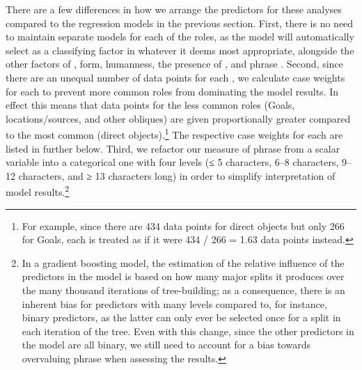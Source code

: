 \documentclass[output=paper,colorlinks,citecolor=brown,draftmode]{langscibook}
\begin{document}
There are a few differences in how we arrange the predictors for these analyses compared to the regression models in the previous section. First, there is no need to maintain separate models for each of the roles, as the model will automatically select  as a classifying factor in whatever it deems most appropriate, alongside the other factors of , form, humanness, the presence of , and phrase . Second, since there are an unequal number of data points for each , we calculate case weights for each  to prevent more common roles from dominating the model results. In effect this means that data points for the less common roles (Goals, locations/sources, and other obliques) are given proportionally greater  compared to the most common  (direct objects).\footnote{For example, since there are 434 data points for direct objects but only 266 for Goals, each  is treated as if it were 434 / 266 = 1.63 data points instead.} The respective case weights for each  are listed in  further below. Third, we refactor our measure of phrase  from a scalar variable into a categorical one with four levels (≤ 5 characters, 6–8 characters, 9–12 characters, and ≥ 13 characters long) in order to simplify interpretation of model results.\footnote{In a gradient boosting model, the estimation of the relative influence of the predictors in the model is based on how many major splits it produces over the many thousand iterations of tree-building; as a consequence, there is an inherent bias for predictors with many levels compared to, for instance, binary predictors, as the latter can only ever be selected once for a split in each iteration of the tree. Even with this change, since the other predictors in the model are all binary, we still need to account for a bias towards overvaluing phrase  when assessing the results.}
\end{document}
